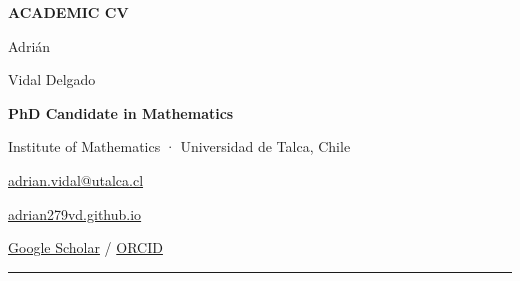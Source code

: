 \documentclass[10pt,a4paper]{article}
\begin{document}
\begin{minipage}[t]{0.69\textwidth}
  {\sffamily\fontsize{8}{11}\selectfont\color{ochre}\bfseries{}ACADEMIC CV}\par\vspace{8pt}
  {\fontsize{28}{30}\selectfont\color{deepblue}Adrián\par Vidal Delgado}\par\vspace{7pt}
  {\sffamily\fontsize{10.8}{13}\selectfont\color{ink}\bfseries PhD Candidate in Mathematics}\par
  {\sffamily\fontsize{9.3}{13}\selectfont\color{quiet}Institute of Mathematics · Universidad de Talca, Chile}
\end{minipage}%
\hfill
\begin{minipage}[t]{0.29\textwidth}
  \raggedleft\vspace{11pt}
  {\sffamily\fontsize{9.05}{13}\selectfont
  \href{mailto:adrian.vidal@utalca.cl}{adrian.vidal@utalca.cl}\par\vspace{4pt}
  \href{https://adrian279vd.github.io/}{adrian279vd.github.io}\par\vspace{4pt}
  \href{https://scholar.google.com/citations?user=HVv9miEAAAAJ\&hl=en}{Google Scholar}\; /\; \href{https://orcid.org/0009-0002-2338-5591}{ORCID}\par}
\end{minipage}

\vspace{10pt}
{\color{deepblue}\rule{\textwidth}{1.15pt}}
\vspace{5pt}
\end{document}
